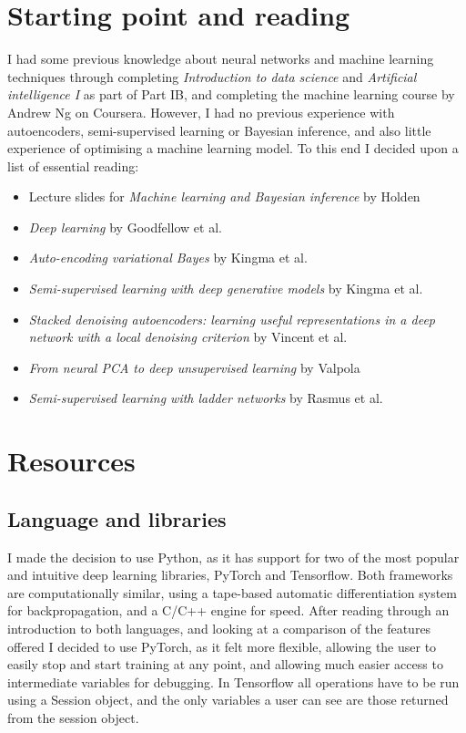 \documentclass[12pt,a4paper,twoside,openright]{report}
\begin{document}
\section{Starting point and reading} \label{reading}

I had some previous knowledge about neural networks and machine learning techniques through completing \textit{Introduction to data science}
and \textit{Artificial intelligence I} as part of Part IB, and completing the machine learning course by Andrew Ng on Coursera. However,
I had no previous experience with autoencoders, semi-supervised learning or Bayesian inference, and also little experience of optimising 
a machine learning model. To this end I decided upon a list of essential reading:

\begin{itemize}
  \item Lecture slides for \textit{Machine learning and Bayesian inference} by Holden~\cite{ML_Bayes}
  \item \textit{Deep learning} by Goodfellow et al.~\cite{Goodfellow-et-al-2016}
  \item \textit{Auto-encoding variational Bayes} by Kingma et al.~\cite{DBLP:journals/corr/KingmaW13}
  \item \textit{Semi-supervised learning with deep generative models} by Kingma et al.~\cite{DBLP:journals/corr/KingmaRMW14}
  \item \textit{Stacked denoising autoencoders: learning useful representations in a deep network with a local denoising criterion} by 
        Vincent et al.~\cite{Vincent:2010:SDA:1756006.1953039}
  \item \textit{From neural PCA to deep unsupervised learning} by Valpola~\cite{DBLP:journals/corr/Valpola14}
  \item \textit{Semi-supervised learning with ladder networks} by Rasmus et al.~\cite{DBLP:journals/corr/RasmusVHBR15}
\end{itemize}

\section{Resources}

\subsection{Language and libraries}

I made the decision to use Python, as it has support for two of the most popular and intuitive deep learning libraries, PyTorch and 
Tensorflow. Both frameworks are computationally similar, using a tape-based automatic differentiation system for backpropagation, and a C/C++ 
engine for speed. After reading through an introduction to both languages, and looking at a comparison of the features offered I decided to 
use PyTorch, as it felt more flexible, allowing the user to easily stop and start training at any point, and allowing much easier access 
to intermediate variables for debugging. In Tensorflow all operations have to be run using a Session object, and the only variables a 
user can see are those returned from the session object.
\end{document}
